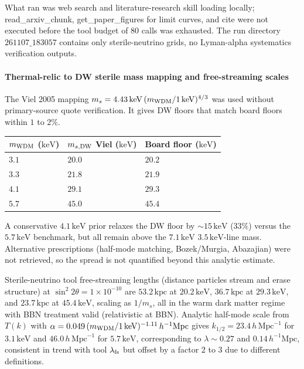\documentclass[11pt,a4paper]{article}
\begin{document}
What ran was web search and literature-research skill loading locally; read\_arxiv\_chunk, get\_paper\_figures for limit curves, and cite were not executed before the tool budget of $80$ calls was exhausted. The run directory $261107\_183057$ contains only sterile-neutrino grids, no Lyman-alpha systematics verification outputs.

\paragraph{Thermal-relic to DW sterile mass mapping and free-streaming scales}
The Viel 2005 mapping $m_s = 4.43\,\mathrm{keV}\,(m_{\rm WDM}/1\,\mathrm{keV})^{4/3}$ was used without primary-source quote verification. It gives DW floors that match board floors within $1$ to $2\%$.

\begin{longtable}{@{}p{}p{}p{}@{}}
\toprule
\textbf{$m_{\rm WDM}$ ($\mathrm{keV}$)} & \textbf{$m_{s,{\rm DW}}$ Viel ($\mathrm{keV}$)} & \textbf{Board floor ($\mathrm{keV}$)} \\ \midrule \endhead
$3.1$ & $20.0$ & $20.2$ \\
$3.3$ & $21.8$ & $21.9$ \\
$4.1$ & $29.1$ & $29.3$ \\
$5.7$ & $45.0$ & $45.4$ \\
\bottomrule\end{longtable}
A conservative $4.1\,\mathrm{keV}$ prior relaxes the DW floor by $\sim 15\,\mathrm{keV}$ ($33\%$) versus the $5.7\,\mathrm{keV}$ benchmark, but all remain above the $7.1\,\mathrm{keV}$ $3.5\,\mathrm{keV}$-line mass. Alternative prescriptions (half-mode matching, Bozek/Murgia, Abazajian) were not retrieved, so the spread is not quantified beyond this analytic estimate.

Sterile-neutrino tool free-streaming lengths (distance particles stream and erase structure) at $\sin^2 2\theta = 1\times10^{-10}$ are $53.2\,\mathrm{kpc}$ at $20.2\,\mathrm{keV}$, $36.7\,\mathrm{kpc}$ at $29.3\,\mathrm{keV}$, and $23.7\,\mathrm{kpc}$ at $45.4\,\mathrm{keV}$, scaling as $1/m_s$, all in the warm dark matter regime with BBN treatment valid (relativistic at BBN). Analytic half-mode scale from $T(k)$ with $\alpha = 0.049\,(m_{\rm WDM}/1\,\mathrm{keV})^{-1.11}\,h^{-1}\mathrm{Mpc}$ gives $k_{1/2} = 23.4\,h\,\mathrm{Mpc}^{-1}$ for $3.1\,\mathrm{keV}$ and $46.0\,h\,\mathrm{Mpc}^{-1}$ for $5.7\,\mathrm{keV}$, corresponding to $\lambda \sim 0.27$ and $0.14\,h^{-1}\mathrm{Mpc}$, consistent in trend with tool $\lambda_{\rm fs}$ but offset by a factor $2$ to $3$ due to different definitions.
\end{document}
